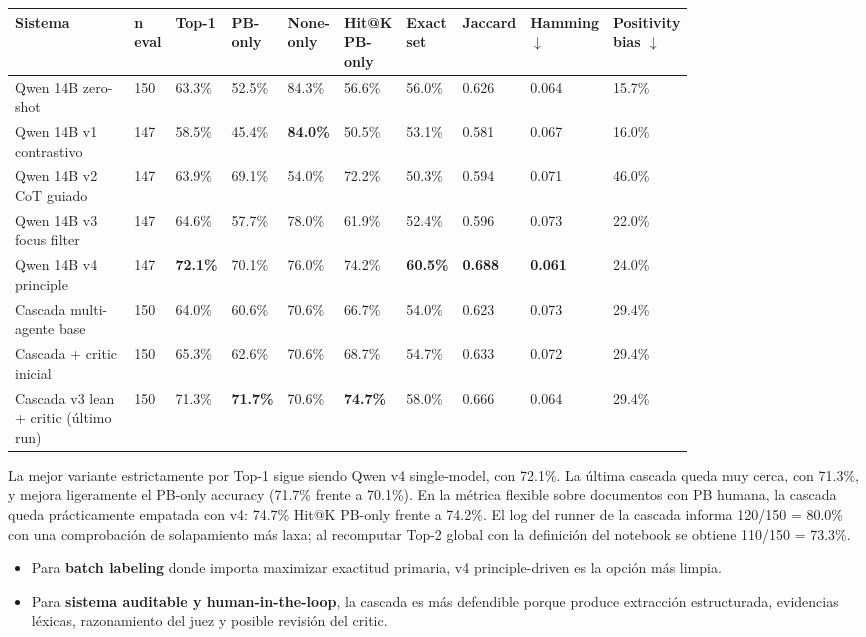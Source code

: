 \begin{center}
\scriptsize
\setlength{\tabcolsep}{3pt}
\renewcommand{\arraystretch}{1.15}
\begin{tabular}{p{0.22\linewidth}p{0.05\linewidth}p{0.065\linewidth}p{0.065\linewidth}p{0.065\linewidth}p{0.065\linewidth}p{0.065\linewidth}p{0.065\linewidth}p{0.065\linewidth}p{0.065\linewidth}}
\toprule
Sistema & n eval & Top-1 & PB-only & None-only & Hit@K PB-only & Exact set & Jaccard & Hamming $\downarrow$ & Positivity bias $\downarrow$ \\
\midrule
Qwen 14B zero-shot & 150 & 63.3\% & 52.5\% & 84.3\% & 56.6\% & 56.0\% & 0.626 & 0.064 & 15.7\% \\
Qwen 14B v1 contrastivo & 147 & 58.5\% & 45.4\% & \textbf{84.0\%} & 50.5\% & 53.1\% & 0.581 & 0.067 & 16.0\% \\
Qwen 14B v2 CoT guiado & 147 & 63.9\% & 69.1\% & 54.0\% & 72.2\% & 50.3\% & 0.594 & 0.071 & 46.0\% \\
Qwen 14B v3 focus filter & 147 & 64.6\% & 57.7\% & 78.0\% & 61.9\% & 52.4\% & 0.596 & 0.073 & 22.0\% \\
Qwen 14B v4 principle & 147 & \textbf{72.1\%} & 70.1\% & 76.0\% & 74.2\% & \textbf{60.5\%} & \textbf{0.688} & \textbf{0.061} & 24.0\% \\
Cascada multi-agente base & 150 & 64.0\% & 60.6\% & 70.6\% & 66.7\% & 54.0\% & 0.623 & 0.073 & 29.4\% \\
Cascada + critic inicial & 150 & 65.3\% & 62.6\% & 70.6\% & 68.7\% & 54.7\% & 0.633 & 0.072 & 29.4\% \\
Cascada v3 lean + critic (último run) & 150 & 71.3\% & \textbf{71.7\%} & 70.6\% & \textbf{74.7\%} & 58.0\% & 0.666 & 0.064 & 29.4\% \\
\bottomrule
\end{tabular}
\end{center}

La mejor variante estrictamente por Top-1 sigue siendo Qwen v4 single-model, con 72.1\%. La última cascada queda muy cerca, con 71.3\%, y mejora ligeramente el PB-only accuracy (71.7\% frente a 70.1\%). En la métrica flexible sobre documentos con PB humana, la cascada queda prácticamente empatada con v4: 74.7\% Hit@K PB-only frente a 74.2\%. El log del runner de la cascada informa 120/150 = 80.0\% con una comprobación de solapamiento más laxa; al recomputar Top-2 global con la definición del notebook se obtiene 110/150 = 73.3\%.

\begin{itemize}
\item Para \textbf{batch labeling} donde importa maximizar exactitud primaria, v4 principle-driven es la opción más limpia.
\item Para \textbf{sistema auditable y human-in-the-loop}, la cascada es más defendible porque produce extracción estructurada, evidencias léxicas, razonamiento del juez y posible revisión del critic.
\end{itemize}

